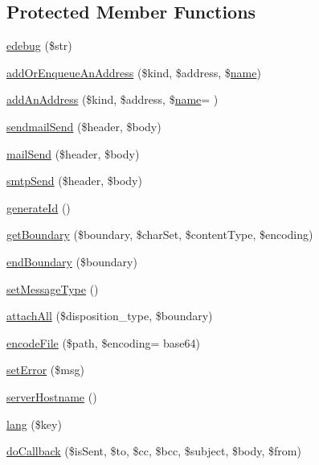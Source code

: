 \subsection*{Protected Member Functions}
\begin{DoxyCompactItemize}
\item 
\hyperlink{class_p_h_p_mailer_a57893521a989230a020d8862a3bf751e}{edebug} (\$str)
\item 
\hyperlink{class_p_h_p_mailer_a61f7f5a3937e4382923604d6354d1934}{add\+Or\+Enqueue\+An\+Address} (\$kind, \$address, \$\hyperlink{user_8php_a765af5e9671743530143a6d3670fd9a6}{name})
\item 
\hyperlink{class_p_h_p_mailer_a57e7af9505dfbabc7c465ee9ca58e562}{add\+An\+Address} (\$kind, \$address, \$\hyperlink{user_8php_a765af5e9671743530143a6d3670fd9a6}{name}= \textquotesingle{}\textquotesingle{})
\item 
\hyperlink{class_p_h_p_mailer_a05940f686d59bcc249d8d42a6f2e7df0}{sendmail\+Send} (\$header, \$body)
\item 
\hyperlink{class_p_h_p_mailer_a9f43cac580fb8f33ef5e159f1eeb9148}{mail\+Send} (\$header, \$body)
\item 
\hyperlink{class_p_h_p_mailer_a49eca48203f71281e82986420773c3be}{smtp\+Send} (\$header, \$body)
\item 
\hyperlink{class_p_h_p_mailer_a7d660a436cd4a6931442c41184b6782a}{generate\+Id} ()
\item 
\hyperlink{class_p_h_p_mailer_a57449646a9556091a31920bf34206a8a}{get\+Boundary} (\$boundary, \$char\+Set, \$content\+Type, \$encoding)
\item 
\hyperlink{class_p_h_p_mailer_aa1451add03edfd34d6b682c53d820a61}{end\+Boundary} (\$boundary)
\item 
\hyperlink{class_p_h_p_mailer_a333e5e1e8f7aabf320d5f2f950812d5b}{set\+Message\+Type} ()
\item 
\hyperlink{class_p_h_p_mailer_ad5142fb4a879dbe9a4280772d255fff8}{attach\+All} (\$disposition\+\_\+type, \$boundary)
\item 
\hyperlink{class_p_h_p_mailer_a0f50908e540f0214dd419e40f378029f}{encode\+File} (\$path, \$encoding= \textquotesingle{}base64\textquotesingle{})
\item 
\hyperlink{class_p_h_p_mailer_a9b84595d8561a0abd81c0b83b6238472}{set\+Error} (\$msg)
\item 
\hyperlink{class_p_h_p_mailer_ae0867f9651bd0b2f78fb7ccca41377a2}{server\+Hostname} ()
\item 
\hyperlink{class_p_h_p_mailer_a702ec4df6918a529cf123d1d09f608b7}{lang} (\$key)
\item 
\hyperlink{class_p_h_p_mailer_a4b0043a4373406a323cce3b6a210041f}{do\+Callback} (\$is\+Sent, \$to, \$cc, \$bcc, \$subject, \$body, \$from)
\end{DoxyCompactItemize}

